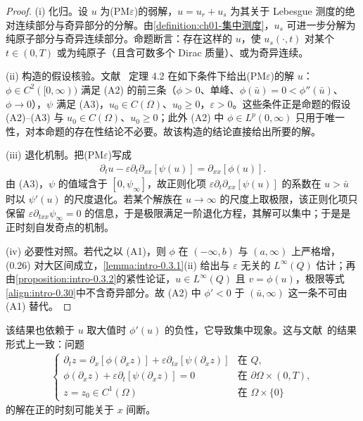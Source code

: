 \documentclass[../main.tex]{subfiles}
\begin{document}
\begin{proof}
(i) 化归。设 $u$ 为(PM$\varepsilon$)的弱解，$u=u_r+u_s$ 为其关于 Lebesgue 测度的绝对连续部分与奇异部分的分解。由\cref{definition:ch01-集中测度}，$u_s$ 可进一步分解为纯原子部分与奇异连续部分。命题断言：存在这样的 $u$，使 $u_s(\cdot,t)$ 对某个 $t\in(0,T)$ 或为纯原子（且含可数多个 Dirac 质量）、或为奇异连续。

(ii) 构造的假设核验。文献~\cite{ref22} 定理 4.2 在如下条件下给出(PM$\varepsilon$)的解 $u$：$\phi\in C^2([0,\infty))$ 满足 (A2) 的前三条（$\phi>0$、单峰、$\phi(\bar u)=0<\phi''(\bar u)$、$\phi\to0$），$\psi$ 满足 (A3)，$u_0\in C(\Omega)$、$u_0\geqslant0$，$\varepsilon>0$。这些条件正是命题的假设 (A2)–(A3) 与 $u_0\in C(\Omega)$、$u_0\geqslant0$；此外 (A2) 中 $\phi\in L^p(0,\infty)$ 只用于唯一性，对本命题的存在性结论不必要。故该构造的结论直接给出所要的解。

(iii) 退化机制。把(PM$\varepsilon$)写成
\begin{align*}
\partial_t u-\varepsilon\partial_t\partial_{xx}[\psi(u)]=\partial_{xx}[\phi(u)] .
\end{align*}
由 (A3)，$\psi$ 的值域含于 $[0,\psi_\infty]$，故正则化项 $\varepsilon\partial_t\partial_{xx}[\psi(u)]$ 的系数在 $u>\bar u$ 时以 $\psi'(u)$ 的尺度退化。若某个解族在 $u\to\infty$ 的尺度上取极限，该正则化项只保留 $\varepsilon\partial_{txx}\psi_\infty=0$ 的信息，于是极限满足一阶退化方程，其解可以集中；于是是正时刻自发奇点的机制。

(iv) 必要性对照。若代之以 (A1)，则 $\phi$ 在 $(-\infty,b)$ 与 $(a,\infty)$ 上严格增，(0.26) 对大区间成立，\cref{lemma:intro-0.3.1}(ii) 给出与 $\varepsilon$ 无关的 $L^\infty(Q)$ 估计；再由\cref{proposition:intro-0.3.2}的紧性论证，$u\in L^\infty(Q)$ 且 $v=\phi(u)$，极限等式\eqref{align:intro-0.30}中不含奇异部分。故 (A2) 中 $\phi'<0$ 于 $(\bar u,\infty)$ 这一条不可由 (A1) 替代。
\end{proof}

该结果也依赖于 $u$ 取大值时 $\phi'(u)$ 的负性，它导致集中现象。这与文献~\cite{ref11}的结果形式上一致：问题
\begin{align*}
\begin{cases}
\partial_t z = \partial_x[\phi(\partial_x z)] + \varepsilon\partial_{tx}[\psi(\partial_x z)] & \text{在 }Q,\\
\phi(\partial_x z) + \varepsilon\partial_t[\psi(\partial_x z)] = 0 & \text{在 }\partial\Omega\times(0,T),\\
z=z_0\in C^1(\Omega) & \text{在 }\Omega\times\{0\}
\end{cases}
\end{align*}
的解在正的时刻可能关于 $x$ 间断。
\end{document}
